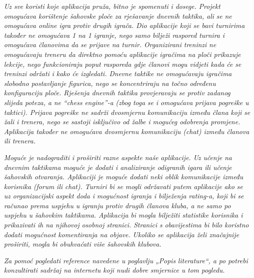 		\textit{	Uz sve koristi koje aplikacija pruža, bitno je spomenuti i dosege.
			Projekt omogućava korištenje šahovske ploče za rješavanje dnevnih
			taktika, ali se ne omogućava online igra protiv drugih igrača. Dio
			aplikacije koji se bavi turnirima također ne omogućava 1 na 1 igranje,
			nego samo bilježi raspored turnira i omogućava članovima da se prijave
			na turnir. Organizirani treninzi ne omogućavaju treneru da direktno
			pomoću aplikacije igračima na ploči prikazuje lekcije, nego
			funkcioniraju poput rasporeda gdje članovi mogu vidjeti kada će se
			treninzi održati i kako će izgledati. Dnevne taktike ne omogućavaju
			igračima slobodno postavljanje figurica, nego se koncentriraju na točno
			određenu konfiguraciju ploče. Rješenja dnevnih taktika provjeravaju se
			protiv zadanog slijeda poteza, a ne ``chess engine''-a (zbog toga se i
			omogućava prijava pogreške u taktici). Prijava pogreške ne sadrži
			dvosmjernu komunikaciju između člana koji se žali i trenera, nego se
			sastoji isključivo od žalbe i mogućeg odobrenja promjene. Aplikacija
			također ne omogućava dvosmjernu komunikaciju (chat) između članova ili
			trenera.}
			
		\textit{	Moguće je nadograditi i proširiti razne aspekte naše aplikacije. Uz
			učenje na dnevnim taktikama moguće je dodati i analiziranje odigranih
			igara ili učenje šahovskih otvaranja. Aplikaciji je moguće dodati neki
			oblik komunikacije između korisnika (forum ili chat). Turniri bi se
			mogli održavati putem aplikacije ako se uz organizacijski aspekt doda i
			mogućnost igranja i bilježenja rating-a, koji bi se računao prema
			uspjehu u igranju protiv drugih članova kluba, a ne samo po uspjehu u
			šahovkim taktikama. Aplikacija bi mogla bilježiti statistike korisnika i
			prikazivati ih na njihovoj osobnoj stranici. Stranici s obavijestima bi
			bilo koristno dodati mogućnost komentiranja na objave. Ukoliko se
			aplikacija želi značajnije proširiti, mogla bi obuhvaćati više šahovskih
			klubova. }
		
		\textit{Za pomoć pogledati reference navedene u poglavlju „Popis literature“, a po potrebi konzultirati sadržaj na internetu koji nudi dobre smjernice u tom pogledu.}
		
